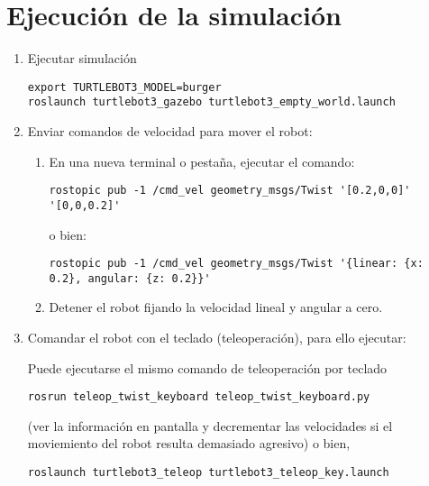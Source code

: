 \documentclass[tp]{lcc}
\begin{document}
\section{Ejecución de la simulación}

\begin{enumerate}
	\item Ejecutar simulación

\begin{lstlisting}[style=bash] 
export TURTLEBOT3_MODEL=burger
roslaunch turtlebot3_gazebo turtlebot3_empty_world.launch
\end{lstlisting}

	\item Enviar comandos de velocidad para mover el robot:

	\begin{enumerate}
	\item En una nueva terminal o pestaña, ejecutar el comando:

\begin{lstlisting}[style=bash] 
rostopic pub -1 /cmd_vel geometry_msgs/Twist '[0.2,0,0]' '[0,0,0.2]'
\end{lstlisting}
o bien:
\begin{lstlisting}[style=bash] 
rostopic pub -1 /cmd_vel geometry_msgs/Twist '{linear: {x: 0.2}, angular: {z: 0.2}}'
\end{lstlisting}

\item Detener el robot fijando la velocidad lineal y angular a cero.
	\end{enumerate}

\item Comandar el robot con el teclado (teleoperación), para ello ejecutar:

Puede ejecutarse el mismo comando de teleoperación por teclado
\begin{lstlisting}[style=bash] 
rosrun teleop_twist_keyboard teleop_twist_keyboard.py
\end{lstlisting}
(ver la información en pantalla y decrementar las velocidades si el moviemiento del robot
resulta demasiado agresivo)
o bien,
\begin{lstlisting}[style=bash] 
roslaunch turtlebot3_teleop turtlebot3_teleop_key.launch
\end{lstlisting}

\end{enumerate}
\end{document}
